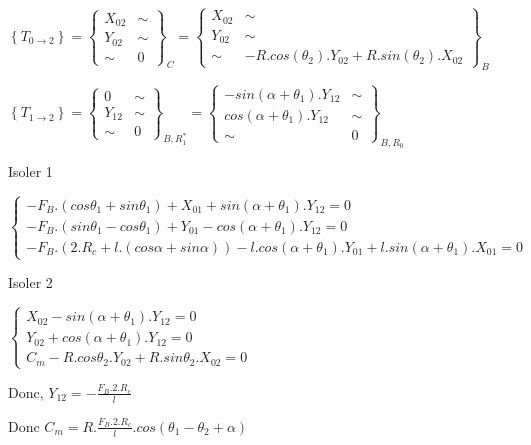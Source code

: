 {$\left\{T_{0\rightarrow 2}\right\}=\left\{\begin{array}{cc}
X_{02} & \sim \\
Y_{02} & \sim \\
\sim & 0
\end{array}\right\}_C=
\left\{\begin{array}{cc}
X_{02} & \sim \\
Y_{02} & \sim \\
\sim & -R.cos(\theta_2).Y_{02}+R.sin(\theta_2).X_{02}
\end{array}\right\}_B$

$\left\{T_{1\rightarrow 2}\right\}=\left\{\begin{array}{cc}
0 & \sim \\
Y_{12} & \sim \\
\sim & 0
\end{array}\right\}_{B,R_1^*}=
\left\{\begin{array}{cc}
-sin(\alpha+\theta_1).Y_{12} & \sim \\
cos(\alpha+\theta_1).Y_{12} & \sim \\
\sim & 0
\end{array}\right\}_{B,R_0}$

Isoler 1

$\left\{\begin{array}{l}
-F_B.(cos\theta_1+sin\theta_1)+X_{01}+sin(\alpha+\theta_1).Y_{12}=0 \\
-F_B.(sin\theta_1-cos\theta_1)+Y_{01}-cos(\alpha+\theta_1).Y_{12}=0 \\
-F_B.(2.R_c+l.(cos\alpha+sin\alpha))-l.cos(\alpha+\theta_1).Y_{01}+l.sin(\alpha+\theta_1).X_{01}=0
\end{array}\right.$

Isoler 2

$\left\{\begin{array}{l}
X_{02}-sin(\alpha+\theta_1).Y_{12}=0 \\
Y_{02}+cos(\alpha+\theta_1).Y_{12}=0 \\
C_m-R.cos\theta_2.Y_{02}+R.sin\theta_2.X_{02}=0
\end{array}\right.$

Donc, $Y_{12}=-\frac{F_B.2.R_c}{l}$

Donc $C_m=R.\frac{F_B.2.R_c}{l}.cos(\theta_1-\theta_2+\alpha)$
}

